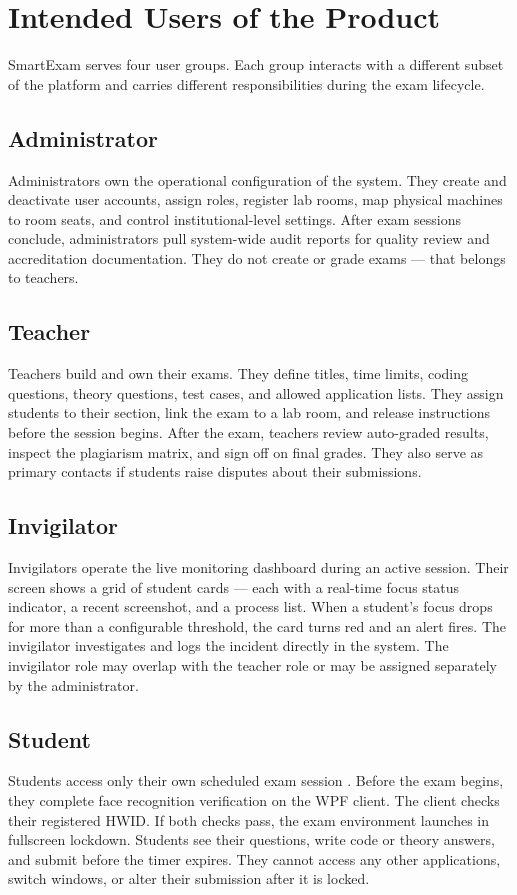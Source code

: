 \section{Intended Users of the Product}

SmartExam serves four user groups. Each group interacts with a different subset of the platform and carries different responsibilities during the exam lifecycle.

\subsection{Administrator}
Administrators own the operational configuration of the system. They create and deactivate user accounts, assign roles, register lab rooms, map physical machines to room seats, and control institutional-level settings. After exam sessions conclude, administrators pull system-wide audit reports for quality review and accreditation documentation. They do not create or grade exams — that belongs to teachers.

\subsection{Teacher}
Teachers build and own their exams. They define titles, time limits, coding questions, theory questions, test cases, and allowed application lists. They assign students to their section, link the exam to a lab room, and release instructions before the session begins. After the exam, teachers review auto-graded results, inspect the plagiarism matrix, and sign off on final grades. They also serve as primary contacts if students raise disputes about their submissions.

\subsection{Invigilator}
Invigilators operate the live monitoring dashboard during an active session. Their screen shows a grid of student cards — each with a real-time focus status indicator, a recent screenshot, and a process list. When a student's focus drops for more than a configurable threshold, the card turns red and an alert fires. The invigilator investigates and logs the incident directly in the system. The invigilator role may overlap with the teacher role or may be assigned separately by the administrator.

\subsection{Student}
Students access only their own scheduled exam session \cite{biometric1}. Before the exam begins, they complete face recognition verification on the WPF client. The client checks their registered HWID. If both checks pass, the exam environment launches in fullscreen lockdown. Students see their questions, write code or theory answers, and submit before the timer expires. They cannot access any other applications, switch windows, or alter their submission after it is locked.